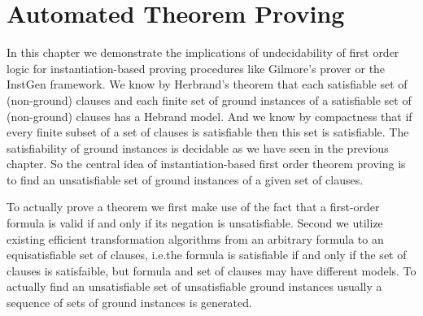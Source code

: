
\chapter{Automated Theorem Proving}



In this chapter we demonstrate the implications of undecidability of first order logic 
for instantiation-based proving procedures like Gilmore's prover or the InstGen framework.
%
We know by Herbrand's theorem 
that each satisfiable set of (non-ground) clauses
and each finite set of ground instances of a satisfiable set of (non-ground) clauses
has a Hebrand model. 
And we know by compactness 
that if every finite subset of a set of clauses is satisfiable then this set is satisfiable.
The satisfiability of ground instances is decidable as we have seen in the previous chapter.
So the central idea of instantiation-based first order theorem proving 
is to find an unsatisfiable set of ground instances of a given set of clauses.

To actually prove a theorem 
we first make use of the fact that a first-order formula is valid if and only if its negation is unsatisfiable.
Second we utilize existing efficient transformation algorithms \cite[...]{tseitin70, PLAISTED1986293}
from an arbitrary formula to an equisatisfiable set of clauses, 
i.e.the formula is satisfiable if and only if the set of clauses is satisfaible, 
but formula and set of clauses may have different models.
To actually find an unsatisfiable set of unsatisfiable ground instances
usually a sequence of sets of ground instances is generated.


%
%
%
%
%




